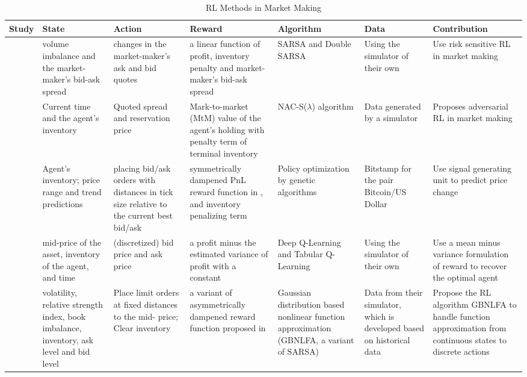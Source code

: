 \begin{table}[]
    \label{table:market_making_2}
    \caption{RL Methods in Market Making}
    \centering
\begin{tabular}{| m{2cm} | m{2.5cm}| m{2.5cm} | m{2.5cm} |m{1.7cm} |m{2cm} | m{2cm} |} 
  \hline
  Study & State & Action & Reward & Algorithm & Data & Contribution\\
  \hline
  \citet{mani2019applications} & volume imbalance and the market-maker’s bid-ask spread &changes in the
market-maker’s ask and bid quotes &a linear function of profit, inventory penalty 
and market-maker’s bid-ask spread & SARSA and Double SARSA & Using the simulator of their own & Use risk sensitive RL in market making
\\
  \hline
  \citet{spooner2020robust} & Current time and the agent's inventory &   Quoted spread and reservation price & Mark-to-market
(MtM) value of the agent's holding with penalty term of terminal inventory &  NAC-S($\lambda$) algorithm & Data generated by a simulator & Proposes adversarial RL in market making\\
  \hline
  \citet{gavsperov2021market} &  Agent’s inventory; price range and trend predictions  & placing bid/ask orders with distances in tick size
relative to the current best bid/ask  & symmetrically dampened PnL reward function in \cite{Spooner2018MM}, and inventory penalizing term & Policy optimization by genetic algorithms & Bitstamp
for the pair Bitcoin/US Dollar& Use  signal generating unit to predict price change
\\
\hline

\citet{selser2021optimal} & mid-price of the asset, inventory of the agent,  and time & (discretized) bid price and ask price &a profit minus the estimated variance of profit with a constant & Deep Q-Learning and Tabular Q-Learning & Using the simulator of their own & Use a mean minus variance formulation of reward to recover the optimal agent  
\\
\hline

\citet{haider2021gaussian} & volatility, relative strength index,
book imbalance, inventory, ask level and bid level & Place limit
orders at
fixed distances
to the mid-
price; Clear
inventory & a variant of asymmetrically dampened reward function proposed in \citet{Spooner2018MM} & Gaussian distribution based nonlinear
function approximation (GBNLFA, a variant of SARSA) & Data from their simulator, which is developed based on historical data & Propose the RL algorithm GBNLFA to handle function approximation from continuous states to discrete actions
\\
\hline


\end{tabular}
\end{table}


